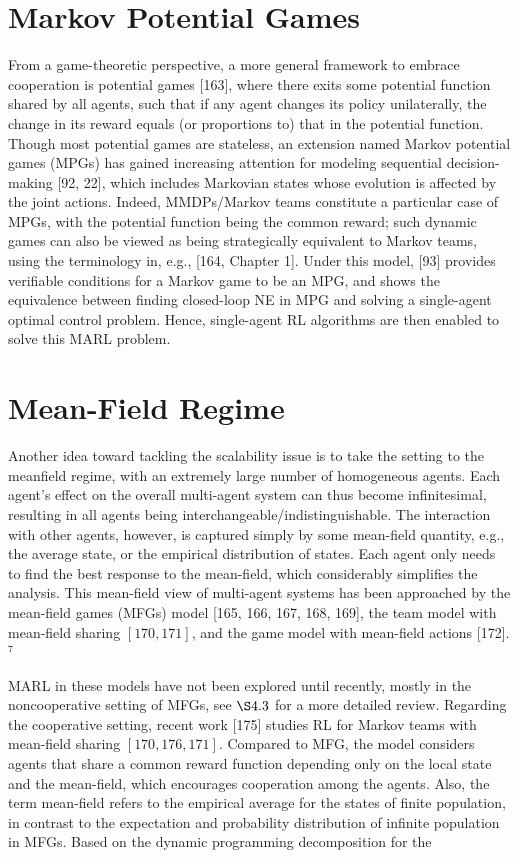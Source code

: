 \documentclass[10pt]{article}
\begin{document}
\section{Markov Potential Games}
From a game-theoretic perspective, a more general framework to embrace cooperation is potential games [163], where there exits some potential function shared by all agents, such that if any agent changes its policy unilaterally, the change in its reward equals (or proportions to) that in the potential function. Though most potential games are stateless, an extension named Markov potential games (MPGs) has gained increasing attention for modeling sequential decision-making [92, 22], which includes Markovian states whose evolution is affected by the joint actions. Indeed, MMDPs/Markov teams constitute a particular case of MPGs, with the potential function being the common reward; such dynamic games can also be viewed as being strategically equivalent to Markov teams, using the terminology in, e.g., [164, Chapter 1]. Under this model, [93] provides verifiable conditions for a Markov game to be an MPG, and shows the equivalence between finding closed-loop NE in MPG and solving a single-agent optimal control problem. Hence, single-agent RL algorithms are then enabled to solve this MARL problem.

\section{Mean-Field Regime}
Another idea toward tackling the scalability issue is to take the setting to the meanfield regime, with an extremely large number of homogeneous agents. Each agent's effect on the overall multi-agent system can thus become infinitesimal, resulting in all agents being interchangeable/indistinguishable. The interaction with other agents, however, is captured simply by some mean-field quantity, e.g., the average state, or the empirical distribution of states. Each agent only needs to find the best response to the mean-field, which considerably simplifies the analysis. This mean-field view of multi-agent systems has been approached by the mean-field games (MFGs) model [165, 166, 167, 168, 169], the team model with mean-field sharing $[170,171]$, and the game model with mean-field actions [172]. ${ }^{7}$

MARL in these models have not been explored until recently, mostly in the noncooperative setting of MFGs, see $\S 4.3$ for a more detailed review. Regarding the cooperative setting, recent work [175] studies RL for Markov teams with mean-field sharing $[170,176,171]$. Compared to MFG, the model considers agents that share a common reward function depending only on the local state and the mean-field, which encourages cooperation among the agents. Also, the term mean-field refers to the empirical average for the states of finite population, in contrast to the expectation and probability distribution of infinite population in MFGs. Based on the dynamic programming decomposition for the
\end{document}

